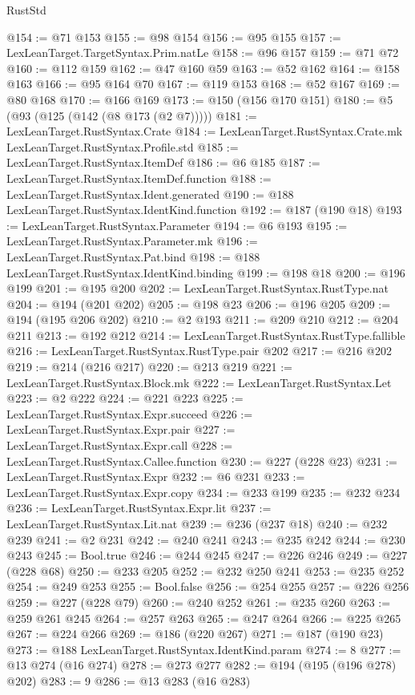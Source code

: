 \begin{lexlean}{RustStd}
\begin{coremodule}
@154 := @71 @153
@155 := @98 @154
@156 := @95 @155
@157 := LexLeanTarget.TargetSyntax.Prim.natLe
@158 := @96 @157
@159 := @71 @72
@160 := @112 @159
@162 := @47 @160 @59
@163 := @52 @162
@164 := @158 @163
@166 := @95 @164 @70
@167 := @119 @153
@168 := @52 @167
@169 := @80 @168
@170 := @166 @169
@173 := @150 (@156 @170 @151)
@180 := @5 (@93 (@125 (@142 (@8 @173 (@2 @7)))))
@181 := LexLeanTarget.RustSyntax.Crate
@184 := LexLeanTarget.RustSyntax.Crate.mk LexLeanTarget.RustSyntax.Profile.std
@185 := LexLeanTarget.RustSyntax.ItemDef
@186 := @6 @185
@187 := LexLeanTarget.RustSyntax.ItemDef.function
@188 := LexLeanTarget.RustSyntax.Ident.generated
@190 := @188 LexLeanTarget.RustSyntax.IdentKind.function
@192 := @187 (@190 @18)
@193 := LexLeanTarget.RustSyntax.Parameter
@194 := @6 @193
@195 := LexLeanTarget.RustSyntax.Parameter.mk
@196 := LexLeanTarget.RustSyntax.Pat.bind
@198 := @188 LexLeanTarget.RustSyntax.IdentKind.binding
@199 := @198 @18
@200 := @196 @199
@201 := @195 @200
@202 := LexLeanTarget.RustSyntax.RustType.nat
@204 := @194 (@201 @202)
@205 := @198 @23
@206 := @196 @205
@209 := @194 (@195 @206 @202)
@210 := @2 @193
@211 := @209 @210
@212 := @204 @211
@213 := @192 @212
@214 := LexLeanTarget.RustSyntax.RustType.fallible
@216 := LexLeanTarget.RustSyntax.RustType.pair @202
@217 := @216 @202
@219 := @214 (@216 @217)
@220 := @213 @219
@221 := LexLeanTarget.RustSyntax.Block.mk
@222 := LexLeanTarget.RustSyntax.Let
@223 := @2 @222
@224 := @221 @223
@225 := LexLeanTarget.RustSyntax.Expr.succeed
@226 := LexLeanTarget.RustSyntax.Expr.pair
@227 := LexLeanTarget.RustSyntax.Expr.call
@228 := LexLeanTarget.RustSyntax.Callee.function
@230 := @227 (@228 @23)
@231 := LexLeanTarget.RustSyntax.Expr
@232 := @6 @231
@233 := LexLeanTarget.RustSyntax.Expr.copy
@234 := @233 @199
@235 := @232 @234
@236 := LexLeanTarget.RustSyntax.Expr.lit
@237 := LexLeanTarget.RustSyntax.Lit.nat
@239 := @236 (@237 @18)
@240 := @232 @239
@241 := @2 @231
@242 := @240 @241
@243 := @235 @242
@244 := @230 @243
@245 := Bool.true
@246 := @244 @245
@247 := @226 @246
@249 := @227 (@228 @68)
@250 := @233 @205
@252 := @232 @250 @241
@253 := @235 @252
@254 := @249 @253
@255 := Bool.false
@256 := @254 @255
@257 := @226 @256
@259 := @227 (@228 @79)
@260 := @240 @252
@261 := @235 @260
@263 := @259 @261 @245
@264 := @257 @263
@265 := @247 @264
@266 := @225 @265
@267 := @224 @266
@269 := @186 (@220 @267)
@271 := @187 (@190 @23)
@273 := @188 LexLeanTarget.RustSyntax.IdentKind.param
@274 := 8
@277 := @13 @274 (@16 @274)
@278 := @273 @277
@282 := @194 (@195 (@196 @278) @202)
@283 := 9
@286 := @13 @283 (@16 @283)

\end{coremodule}
\end{lexlean}
